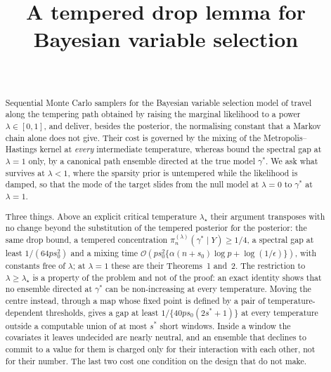 \documentclass[aos]{imsart}
\theoremstyle{plain}
\theoremstyle{definition}
\begin{document}
    \begin{frontmatter}
        \title{A tempered drop lemma for Bayesian variable selection}

        \begin{aug}
            \author[A]{~}
            \address[A]{CREST, ENSAE, IP Paris}
        \end{aug}

        \begin{abstract}
            Sequential Monte Carlo samplers for the Bayesian variable
            selection model of \citet{YangWainwrightJordan2016} travel along
            the tempering path obtained by raising the marginal likelihood to
            a power $\lambda\in[0,1]$, and deliver, besides the posterior,
            the normalising constant that a Markov chain alone does not give.
            Their cost is governed by the mixing of the Metropolis--Hastings
            kernel at \emph{every} intermediate temperature, whereas
            \citet{YangWainwrightJordan2016} bound the spectral gap at
            $\lambda=1$ only, by a canonical path ensemble directed at the
            true model $\gamma^{\ast}$. We ask what survives at $\lambda<1$,
            where the sparsity prior is untempered while the likelihood is
            damped, so that the mode of the target slides from the null model
            at $\lambda=0$ to $\gamma^{\ast}$ at $\lambda=1$.

            Three things. Above an explicit critical temperature
            $\lambda_\star$ their argument transposes with no change beyond
            the substitution of the tempered posterior for the posterior: the
            same drop bound, a tempered concentration
            $\pi_n^{(\lambda)}(\gamma^{\ast}\mid Y)\geq1/4$, a spectral gap at
            least $1/(64ps_0^{2})$ and a mixing time
            $\mathcal{O}(ps_0^{2}\{\alpha(n+s_0)\log p+\log(1/\epsilon)\})$,
            with constants free of $\lambda$; at $\lambda=1$ these are their
            Theorems~1 and~2. The restriction to $\lambda\geq\lambda_\star$
            is a property of the problem and not of the proof: an exact
            identity shows that no ensemble directed at $\gamma^{\ast}$ can
            be non-increasing at every temperature. Moving the centre
            instead, through a map whose fixed point is defined by a pair of
            temperature-dependent thresholds, gives a gap at least
            $1/\{40ps_0(2s^{\ast}+1)\}$ at every temperature outside a
            computable union of at most $s^{\ast}$ short windows. Inside a
            window the covariates it leaves undecided are nearly neutral, and
            an ensemble that declines to commit to a value for them is charged
            only for their interaction with each other, not for their number.
            The last two cost one condition on the design that
            \citet{YangWainwrightJordan2016} do not make.
        \end{abstract}
    \end{frontmatter}
\end{document}
